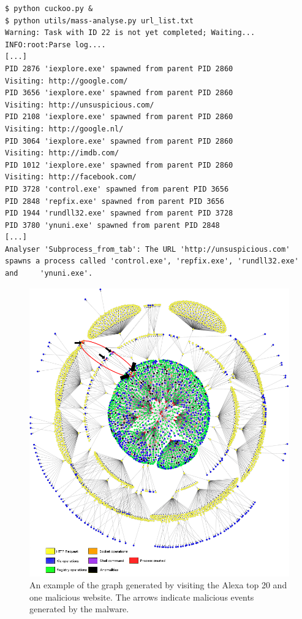 \pagebreak

\begin{lstlisting}[caption={Mass analyser being run},label={code:run}]
$ python cuckoo.py &
$ python utils/mass-analyse.py url_list.txt
Warning: Task with ID 22 is not yet completed; Waiting...
INFO:root:Parse log....
[...]
PID 2876 'iexplore.exe' spawned from parent PID 2860
Visiting: http://google.com/
PID 3656 'iexplore.exe' spawned from parent PID 2860
Visiting: http://unsuspicious.com/
PID 2108 'iexplore.exe' spawned from parent PID 2860
Visiting: http://google.nl/
PID 3064 'iexplore.exe' spawned from parent PID 2860
Visiting: http://imdb.com/
PID 1012 'iexplore.exe' spawned from parent PID 2860
Visiting: http://facebook.com/
PID 3728 'control.exe' spawned from parent PID 3656
PID 2848 'repfix.exe' spawned from parent PID 3656
PID 1944 'rundll32.exe' spawned from parent PID 3728
PID 3780 'ynuni.exe' spawned from parent PID 2848
[...]
Analyser 'Subprocess_from_tab': The URL 'http://unsuspicious.com' spawns a process called 'control.exe', 'repfix.exe', 'rundll32.exe' and     'ynuni.exe'.
\end{lstlisting}

\pagebreak

\begin{figure}[h]
    \centering
    \centerline{\includegraphics[width=20cm]{Images/graph4.jpg}}
    \caption{An example of the graph generated by visiting the Alexa top 20 and one malicious website. The arrows indicate malicious events generated by the malware.}
    \label{fig:graph}
\end{figure}

